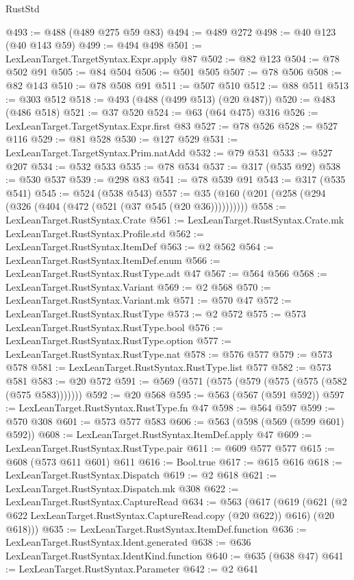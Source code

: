 \begin{lexlean}{RustStd}
\begin{coremodule}
@493 := @488 (@489 @275 @59 @83)
@494 := @489 @272
@498 := @40 @123 (@40 @143 @59)
@499 := @494 @498
@501 := LexLeanTarget.TargetSyntax.Expr.apply @87
@502 := @82 @123
@504 := @78 @502 @91
@505 := @84 @504
@506 := @501 @505
@507 := @78 @506
@508 := @82 @143
@510 := @78 @508 @91
@511 := @507 @510
@512 := @88 @511
@513 := @303 @512
@518 := @493 (@488 (@499 @513) (@20 @487))
@520 := @483 (@486 @518)
@521 := @37 @520
@524 := @63 (@64 @475) @316
@526 := LexLeanTarget.TargetSyntax.Expr.first @83
@527 := @78 @526
@528 := @527 @116
@529 := @81 @528
@530 := @127 @529
@531 := LexLeanTarget.TargetSyntax.Prim.natAdd
@532 := @79 @531
@533 := @527 @207
@534 := @532 @533
@535 := @78 @534
@537 := @317 (@535 @92)
@538 := @530 @537
@539 := @298 @83
@541 := @78 @539 @91
@543 := @317 (@535 @541)
@545 := @524 (@538 @543)
@557 := @35 (@160 (@201 (@258 (@294 (@326 (@404 (@472 (@521 (@37 @545 (@20 @36))))))))))
@558 := LexLeanTarget.RustSyntax.Crate
@561 := LexLeanTarget.RustSyntax.Crate.mk LexLeanTarget.RustSyntax.Profile.std
@562 := LexLeanTarget.RustSyntax.ItemDef
@563 := @2 @562
@564 := LexLeanTarget.RustSyntax.ItemDef.enum
@566 := LexLeanTarget.RustSyntax.RustType.adt @47
@567 := @564 @566
@568 := LexLeanTarget.RustSyntax.Variant
@569 := @2 @568
@570 := LexLeanTarget.RustSyntax.Variant.mk
@571 := @570 @47
@572 := LexLeanTarget.RustSyntax.RustType
@573 := @2 @572
@575 := @573 LexLeanTarget.RustSyntax.RustType.bool
@576 := LexLeanTarget.RustSyntax.RustType.option
@577 := LexLeanTarget.RustSyntax.RustType.nat
@578 := @576 @577
@579 := @573 @578
@581 := LexLeanTarget.RustSyntax.RustType.list @577
@582 := @573 @581
@583 := @20 @572
@591 := @569 (@571 (@575 (@579 (@575 (@575 (@582 (@575 @583)))))))
@592 := @20 @568
@595 := @563 (@567 (@591 @592))
@597 := LexLeanTarget.RustSyntax.RustType.fn @47
@598 := @564 @597
@599 := @570 @308
@601 := @573 @577 @583
@606 := @563 (@598 (@569 (@599 @601) @592))
@608 := LexLeanTarget.RustSyntax.ItemDef.apply @47
@609 := LexLeanTarget.RustSyntax.RustType.pair
@611 := @609 @577 @577
@615 := @608 (@573 @611 @601) @611
@616 := Bool.true
@617 := @615 @616
@618 := LexLeanTarget.RustSyntax.Dispatch
@619 := @2 @618
@621 := LexLeanTarget.RustSyntax.Dispatch.mk @308
@622 := LexLeanTarget.RustSyntax.CaptureRead
@634 := @563
    (@617
      (@619 (@621 (@2 @622 LexLeanTarget.RustSyntax.CaptureRead.copy (@20 @622)) @616) (@20 @618)))
@635 := LexLeanTarget.RustSyntax.ItemDef.function
@636 := LexLeanTarget.RustSyntax.Ident.generated
@638 := @636 LexLeanTarget.RustSyntax.IdentKind.function
@640 := @635 (@638 @47)
@641 := LexLeanTarget.RustSyntax.Parameter
@642 := @2 @641

\end{coremodule}
\end{lexlean}
